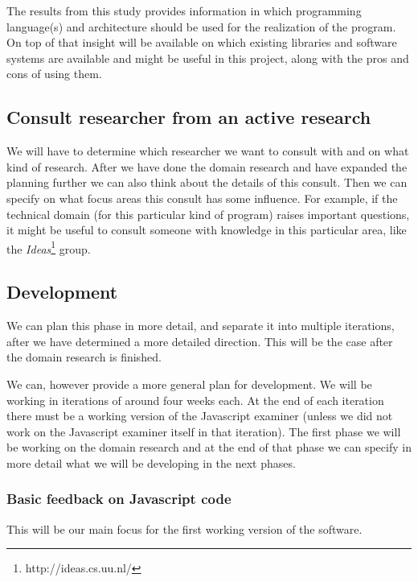 \documentclass{article}
\begin{document}
The results from this study provides information in which programming
language(s) and architecture should be used for the realization of the
program. On top of that insight will be available on which existing libraries
and software systems are available and might be useful in this project, along
with the pros and cons of using them.

\subsection{Consult researcher from an active research}
We will have to determine which researcher we want to consult with and on what
kind of research. After we have done the domain research and have expanded the
planning further we can also think about the details of this consult. Then we
can specify on what focus areas this consult has some influence. For example,
if the technical domain (for this particular kind of program) raises important
questions, it might be useful to consult someone with knowledge in this
particular area, like the {\em Ideas}\footnote{http://ideas.cs.uu.nl/} group.

\subsection{Development} 

We can plan this phase in more detail, and separate it into multiple
iterations, after we have determined a more detailed direction. This will be
the case after the domain research is finished.

We can, however provide a more general plan for development. We will be working
in iterations of around four weeks each. At the end of each iteration there
must be a working version of the Javascript examiner (unless we did not work on
the Javascript examiner itself in that iteration). The first phase we will be
working on the domain research and at the end of that phase we can specify in
more detail what we will be developing in the next phases.

\subsubsection{Basic feedback on Javascript code}
This will be our main focus for the first working version of the software.
\end{document}
